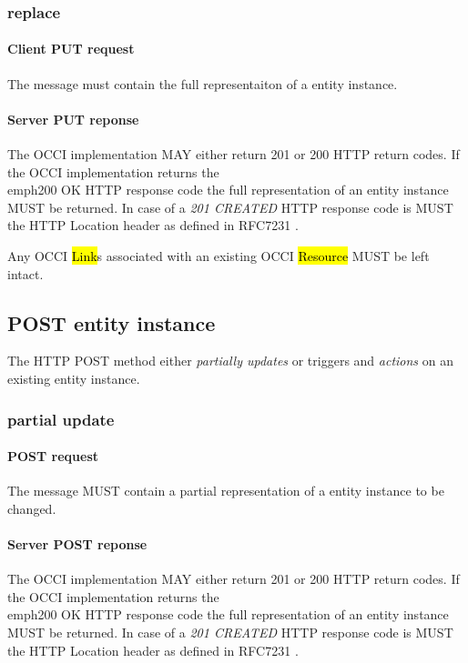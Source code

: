 \documentclass[10pt,a4paper]{article}
\begin{document}
\subsubsection{replace}

\paragraph{Client PUT request}
The message must contain the full representaiton of a entity instance.

\paragraph{Server PUT reponse}
The OCCI implementation MAY either return 201 or 200 HTTP return codes. If the OCCI implementation
returns the \\emph{200 OK} HTTP response code the full representation of an entity instance MUST be returned. 
In case of a \emph{201 CREATED} HTTP response code is MUST the HTTP Location header as defined in RFC7231 \cite{rfc7231}.

Any OCCI \hl{Link}s associated with an existing OCCI \hl{Resource} MUST be left intact.

\subsection{POST entity instance}
The HTTP POST method either {\em partially updates} or triggers and {\em actions} on an existing entity instance.

\subsubsection{partial update}

\paragraph{POST request}
The message MUST contain a partial representation of a entity instance to be changed.

\paragraph{Server POST reponse}
The OCCI implementation MAY either return 201 or 200 HTTP return codes. If the OCCI implementation
returns the \\emph{200 OK} HTTP response code the full representation of an entity instance MUST be returned. 
In case of a \emph{201 CREATED} HTTP response code is MUST the HTTP Location header as defined in RFC7231 \cite{rfc7231}.
\end{document}
